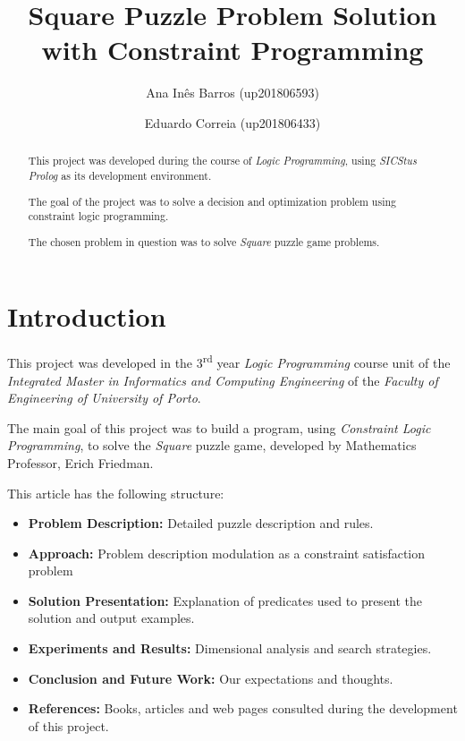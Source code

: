 \documentclass[runningheads]{llncs}
\begin{document}
\title{Square Puzzle Problem Solution with Constraint Programming}

\author{Ana Inês Barros (up201806593) \and Eduardo Correia (up201806433)}


\maketitle

\begin{abstract}

This project was developed during the course of \textit{Logic Programming}, using \textit{SICStus Prolog} as its development environment.

The goal of the project was to solve a decision and optimization problem using constraint logic programming.

The chosen problem in question was to solve \textit{Square} puzzle game problems.


\end{abstract}

\section{Introduction}

This project was developed in the 3\textsuperscript{rd} year \textit{Logic Programming} course unit of the \textit{Integrated Master in Informatics and Computing Engineering} of the \textit{Faculty of Engineering of University of Porto}.

The main goal of this project was to build a program, using \textit{Constraint Logic Programming}, to solve the \textit{Square} puzzle game, developed by Mathematics Professor, Erich Friedman.

This article has the following structure:

\begin{itemize}
    \item \textbf{Problem Description:} Detailed puzzle description and rules.
    \item \textbf{Approach:} Problem description modulation as a constraint satisfaction problem
    \item \textbf{Solution Presentation:} Explanation of predicates used to present the solution and output examples.
    \item \textbf{Experiments and Results:} Dimensional analysis and search strategies.
    \item \textbf{Conclusion and Future Work:} Our expectations and thoughts.
    \item \textbf{References:} Books, articles and web pages consulted during the development of this project.
\end{itemize}
\end{document}
